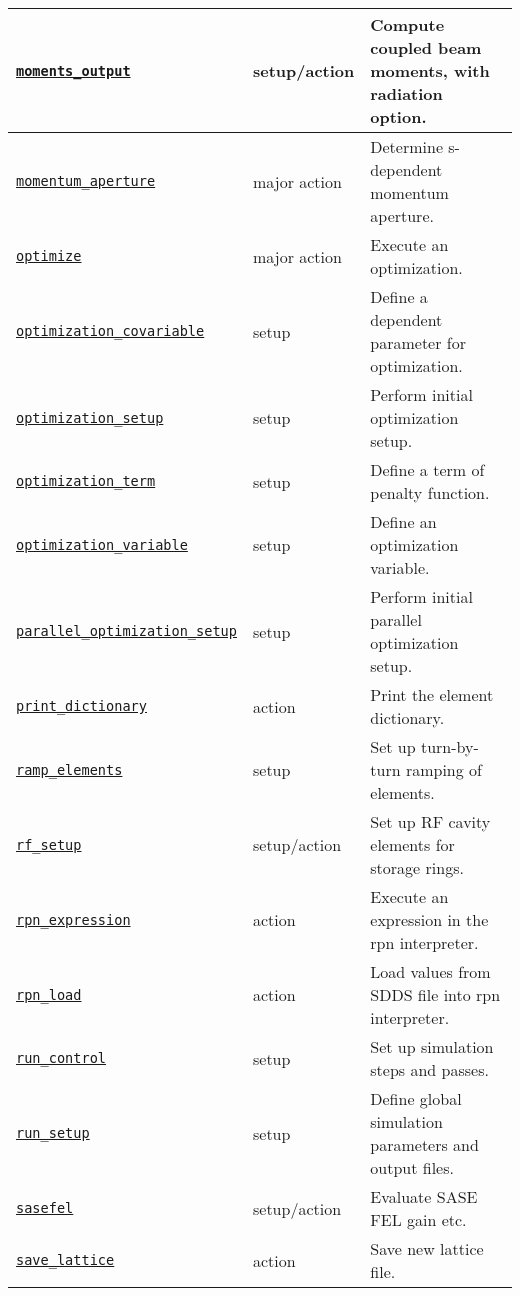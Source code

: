 \documentclass[11pt]{article}
\begin{document}
\begin{longtable}{|p{2.75in}|p{0.75in}|p{2.75in}|}
\hyperref[subsec:momentsoutput]{\tt moments\_output} & setup/action & Compute coupled beam moments, with radiation option. \\ \hline
\hyperref[subsec:momentumaperture]{\tt momentum\_aperture} & major action & Determine s-dependent momentum aperture. \\ \hline
\hyperref[subsec:optimize]{\tt optimize} & major action & Execute an optimization. \\ \hline
\hyperref[subsec:optimizationcovariable]{\tt optimization\_covariable} & setup & Define a dependent parameter for optimization. \\ \hline
\hyperref[subsec:optimizationsetup]{\tt optimization\_setup} & setup & Perform initial optimization setup. \\ \hline
\hyperref[subsec:optimizationterm]{\tt optimization\_term} & setup & Define a term of penalty function. \\ \hline
\hyperref[subsec:optimizationvariable]{\tt optimization\_variable} & setup & Define an optimization variable. \\ \hline
\hyperref[subsec:paralleloptimizationsetup]{\tt parallel\_optimization\_setup} & setup & Perform initial parallel optimization setup. \\ \hline
\hyperref[subsec:printdictionary]{\tt print\_dictionary} & action & Print the element dictionary. \\ \hline
\hyperref[subsec:rampelements]{\tt ramp\_elements} & setup & Set up turn-by-turn ramping of elements. \\ \hline
\hyperref[subsec:rfsetup]{\tt rf\_setup} & setup/action & Set up RF cavity elements for storage rings. \\ \hline
\hyperref[subsec:rpnexpression]{\tt rpn\_expression} & action & Execute an expression in the rpn interpreter. \\ \hline
\hyperref[subsec:rpnload]{\tt rpn\_load} & action & Load values from SDDS file into rpn interpreter. \\ \hline
\hyperref[subsec:runcontrol]{\tt run\_control} & setup & Set up simulation steps and passes. \\ \hline
\hyperref[subsec:runsetup]{\tt run\_setup} & setup & Define global simulation parameters and output files. \\ \hline
\hyperref[subsec:sasefel]{\tt sasefel} & setup/action & Evaluate SASE FEL gain etc. \\ \hline
\hyperref[subsec:savelattice]{\tt save\_lattice} & action & Save new lattice file. \\ \hline

\end{longtable}
\end{document}
